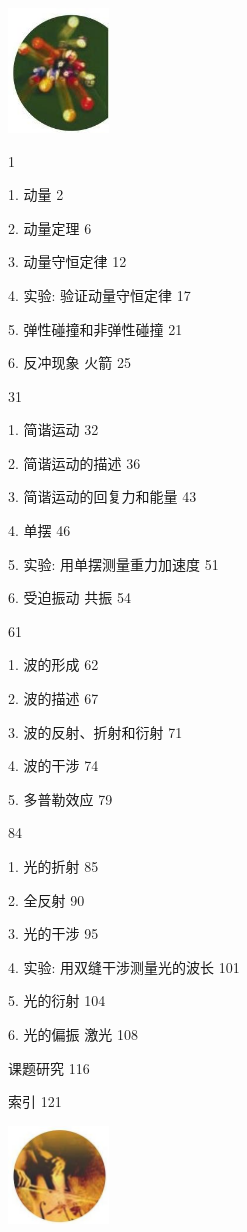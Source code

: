\documentclass[10pt]{article}
\begin{document}
\begin{center}
\includegraphics[max width=0.2\textwidth]{images/01910e4c-ebb8-7d2c-8f2f-2375bc1d2d12_4_725324.jpg}
\end{center}

1

1. 动量 2

2. 动量定理 6

3. 动量守恒定律 12

4. 实验: 验证动量守恒定律 17

5. 弹性碰撞和非弹性碰撞 21

6. 反冲现象 火箭 25

31

1. 简谐运动 32

2. 简谐运动的描述 36

3. 简谐运动的回复力和能量 43

4. 单摆 46

5. 实验: 用单摆测量重力加速度 51

6. 受迫振动 共振 54

61

1. 波的形成 62

2. 波的描述 67

3. 波的反射、折射和衍射 71

4. 波的干涉 74

5. 多普勒效应 79

84

1. 光的折射 85

2. 全反射 90

3. 光的干涉 95

4. 实验: 用双缝干涉测量光的波长 101

5. 光的衍射 104

6. 光的偏振 激光 108

课题研究 116

索引 121

\begin{center}
\includegraphics[max width=0.2\textwidth]{images/01910e4c-ebb8-7d2c-8f2f-2375bc1d2d12_4_158038.jpg}
\end{center}
\end{document}
